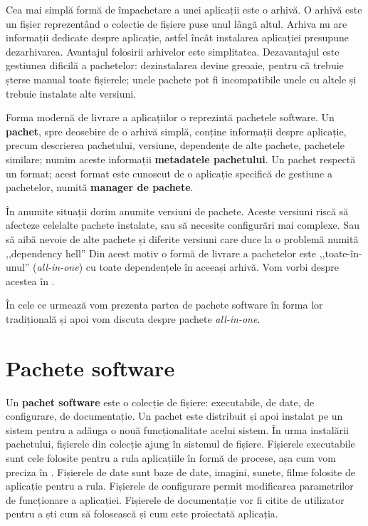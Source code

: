 Cea mai simplă formă de împachetare a unei aplicații este o arhivă.
O arhivă este un fișier reprezentând o colecție de fișiere puse unul lângă altul.
Arhiva nu are informații dedicate despre aplicație, astfel încât instalarea aplicației presupune dezarhivarea.
Avantajul folosirii arhivelor este simplitatea.
Dezavantajul este gestiunea dificilă a pachetelor: dezinstalarea devine greoaie, pentru că trebuie șterse manual toate fișierele;
unele pachete pot fi incompatibile unele cu altele și trebuie instalate alte versiuni.

Forma modernă de livrare a aplicațiilor o reprezintă pachetele software.
Un \textbf{pachet}, spre deosebire de o arhivă simplă, conține informații despre aplicație, precum descrierea pachetului, versiune, dependențe de alte pachete, pachetele similare;
numim aceste informații \textbf{metadatele pachetului}.
Un pachet respectă un format;
acest format este cunoscut de o aplicație specifică de gestiune a pachetelor, numită \textbf{manager de pachete}.

În anumite situații dorim anumite versiuni de pachete.
Aceste versiuni riscă să afecteze celelalte pachete instalate, sau să necesite configurări mai complexe.
Sau să aibă nevoie de alte pachete și diferite versiuni care duce la o problemă numită ,,dependency hell'' Din acest motiv o formă de livrare a pachetelor este ,,toate-în-unul'' (\textit{all-in-one}) cu toate dependențele în aceeași arhivă.
Vom vorbi despre acestea în .

În cele ce urmează vom prezenta partea de pachete software în forma lor tradițională și apoi vom discuta despre pachete \textit{all-in-one}.

\section{Pachete software}
\label{sec:package:overview}

Un \textbf{pachet software} este o colecție de fișiere: executabile, de date, de configurare, de documentație.
Un pachet este distribuit și apoi instalat pe un sistem pentru a adăuga o nouă funcționalitate acelui sistem.
În urma instalării pachetului, fișierele din colecție ajung în sistemul de fișiere.
Fișierele executabile sunt cele folosite pentru a rula aplicațiile în formă de procese, așa cum vom preciza în .
Fișierele de date sunt baze de date, imagini, sunete, filme folosite de aplicație pentru a rula.
Fișierele de configurare permit modificarea parametrilor de funcționare a aplicației.
Fișierele de documentație vor fi citite de utilizator pentru a ști cum să folosească și cum este proiectată aplicația.


